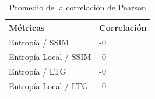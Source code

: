 \documentclass[spanish,twocolumn]{article}
\begin{document}
{\begin{table}[htbp]
\begin{center}
\begin{tabular}{|l|l|}
\hline
Métricas & Correlación \\
\hline \hline
Entropía / SSIM & -0 \\ \hline
Entropía Local / SSIM & -0\\ \hline
Entropía / LTG & -0 \\ \hline
Entropía Local / LTG & -0 \\ \hline
\end{tabular}
\caption{Promedio de la correlación de Pearson}
\label{tabla:promcorrelacion}
\end{center}
\end{table}



\noindent\begin{minipage}[b]{1.0\linewidth}
  \centering
   

\end{minipage}}
\end{document}
